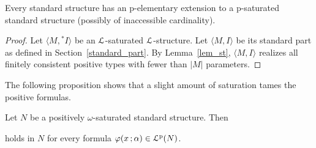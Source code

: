 \documentclass[10pt,oneside]{amsproc}
\begin{document}
\begin{theorem}
  Every standard structure has an p-elementary extension to a p-saturated standard structure (possibly of inaccessible cardinality).
\end{theorem}

\begin{proof}
  Let $\langle M,{}^*\!\!I\rangle$ be an ${\EuScript L}$-saturated ${\EuScript L}$-structure.
  Let $\langle M,I\rangle$ be its standard part as defined in Section~\ref{standard_part}.
  By Lemma~\ref{lem_st}, $\langle M,I\rangle$ realizes all finitely consistent positive types with fewer than $|M|$ parameters.
\end{proof}





The following proposition shows that a slight amount of saturation tames the positive formulas.

\begin{proposition}\label{prop_approx}
  Let $N$ be a positively $\omega$-saturated standard structure.
  Then 
  
  
  holds in $N$ for every formula $\varphi(x\,;\alpha)\in{\EuScript L}^{\rm p}(N)$.
\end{proposition}
\end{document}
